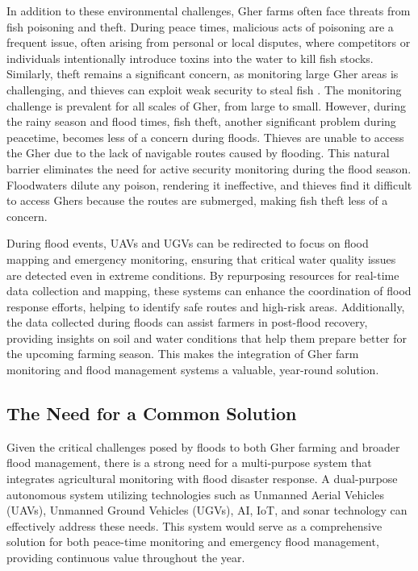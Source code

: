 \documentclass[conference]{IEEEtran}
\begin{document}
In addition to these environmental challenges, Gher farms often face threats from fish poisoning and theft. During peace times, malicious acts of poisoning are a frequent issue, often arising from personal or local disputes, where competitors or individuals intentionally introduce toxins into the water to kill fish stocks. Similarly, theft remains a significant concern, as monitoring large Gher areas is challenging, and thieves can exploit weak security to steal fish \cite{ref1}. The monitoring challenge is prevalent for all scales of Gher, from large to small. However, during the rainy season and flood times, fish theft, another significant problem during peacetime, becomes less of a concern during floods. Thieves are unable to access the Gher due to the lack of navigable routes caused by flooding. This natural barrier eliminates the need for active security monitoring during the flood season. Floodwaters dilute any poison, rendering it ineffective, and thieves find it difficult to access Ghers because the routes are submerged, making fish theft less of a concern.

During flood events, UAVs and UGVs can be redirected to focus on flood mapping and emergency monitoring, ensuring that critical water quality issues are detected even in extreme conditions. By repurposing resources for real-time data collection and mapping, these systems can enhance the coordination of flood response efforts, helping to identify safe routes and high-risk areas. Additionally, the data collected during floods can assist farmers in post-flood recovery, providing insights on soil and water conditions that help them prepare better for the upcoming farming season. This makes the integration of Gher farm monitoring and flood management systems a valuable, year-round solution.

\subsection{\textbf{The Need for a Common Solution}}
Given the critical challenges posed by floods to both Gher farming and broader flood management, there is a strong need for a multi-purpose system that integrates agricultural monitoring with flood disaster response. A dual-purpose autonomous system utilizing technologies such as Unmanned Aerial Vehicles (UAVs), Unmanned Ground Vehicles (UGVs), AI, IoT, and sonar technology can effectively address these needs. This system would serve as a comprehensive solution for both peace-time monitoring and emergency flood management, providing continuous value throughout the year.
\end{document}
